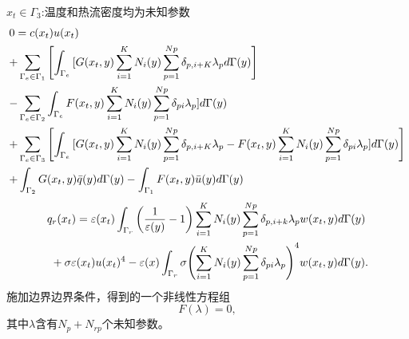 ${x_t} \in {\Gamma _3}$:温度和热流密度均为未知参数
\[\begin{gathered}
  0 = c({x_t})u({x_t}) \hfill \\
   + \sum\limits_{{\Gamma _e} \in {\Gamma _1}}^{} {\left[ {\int_{{\Gamma _e}}^{} {[G({x_t},y)\sum\limits_{i = 1}^K {{N_i}(y)\sum\limits_{p = 1}^{Np} {{\delta _{p,i + K}}{\lambda _p}} } d\Gamma (y)} } \right]}  \hfill \\
   - \sum\limits_{{\Gamma _e} \in {\Gamma _2}} {\int_{{\Gamma _e}}^{} {F({x_t},y)\sum\limits_{i = 1}^K {{N_i}(y)\sum\limits_{p = 1}^{Np} {{\delta _{pi}}{\lambda _p}} } ]d\Gamma (y)} }  \hfill \\
   + \sum\limits_{{\Gamma _e} \in {\Gamma _3}}^{} {\left[ {\int_{{\Gamma _e}}^{} {[G({x_t},y)\sum\limits_{i = 1}^K {{N_i}(y)\sum\limits_{p = 1}^{Np} {{\delta _{p,i + K}}{\lambda _p}} }  - F({x_t},y)\sum\limits_{i = 1}^K {{N_i}(y)\sum\limits_{p = 1}^{Np} {{\delta _{pi}}{\lambda _p}} } ]d\Gamma (y)} } \right]}  \hfill \\
   + \int_{{\Gamma _2}}^{} {G({x_t},y)\bar q(y)d\Gamma (y) - \int_{{\Gamma _1}}^{} {F({x_t},y)\bar u(y)d\Gamma (y)} }  \hfill \\ 
\end{gathered} \]
\[\begin{gathered}
  {q_r}({x_t}) = \varepsilon ({x_t})\int_{{\Gamma _r}} {\left( {\frac{1}{{\varepsilon (y)}} - 1} \right)\sum\limits_{i = 1}^K {{N_i}(y)\sum\limits_{p = 1}^{Np} {{\delta _{p,i + k}}{\lambda _p}} } w({x_t},y)d\Gamma (y)}  \hfill \\
  {\text{           }} + \sigma \varepsilon ({x_t})u{({x_t})^4} - \varepsilon (x)\int_{{\Gamma _r}} {\sigma {{\left( {\sum\limits_{i = 1}^K {{N_i}(y)\sum\limits_{p = 1}^{Np} {{\delta _{pi}}{\lambda _p}} } } \right)}^4}w({x_t},y)d\Gamma (y)} . \hfill \\ 
\end{gathered} \]
施加边界边界条件，得到的一个非线性方程组
\begin{equation}
	F(\lambda ) = 0,
\end{equation}
其中$\lambda $含有$N_p + N_{rp}$个未知参数。


